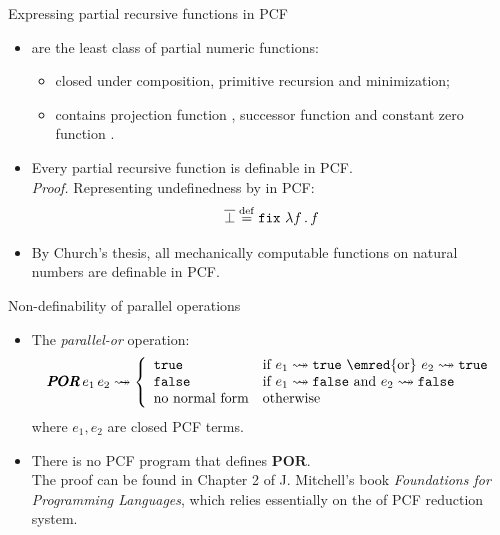 \documentclass[paper=screen,mode=present,style=zysimple]{powerdot}
\begin{document}
\begin{slide}{Expressing partial recursive functions in PCF}
\begin{itemize}
\item {} are the least class of partial numeric functions:
\vspace*{-0.5em}
\begin{itemize}
\item closed under composition, primitive recursion and minimization;
\item contains projection function , successor function 
  and constant zero function .
\end{itemize}
\item Every partial recursive function is definable in PCF. \\[0.3em]
{\em Proof. } Representing undefinedness by  in PCF: 
\[
\overline{\bot} \defeq \cfix \, \lambda f \ldot f
\vspace*{-1.5em}
\]
\item By Church's thesis, all mechanically computable functions on natural numbers are definable in PCF.
\end{itemize}
\end{slide}

\begin{slide}{Non-definability of parallel operations}
\begin{itemize}
\item The {\em parallel-or} operation:
\[
\pmb{POR} \, e_1 \, e_2 \reduceto \left \{
\begin{array}{ll}
\ctrue & \mbox{if $e_1 \reduceto \ctrue$ \emred{or}  $e_2 \reduceto \ctrue$} 
\\
\cfalse & \mbox{if $e_1 \reduceto \cfalse$ and $e_2 \reduceto \cfalse$} 
\\
\mbox{no normal form} & \mbox{otherwise}
\end{array}
\right .
\]
where $e_1, e_2$ are closed PCF terms. 
\item There is no PCF program that defines $\pmb{POR}$.
\\[0.3em]
The proof can be found in Chapter 2 of J. Mitchell's book {\em Foundations for Programming Languages},
which relies essentially on the  of PCF reduction system.
\end{itemize}
\end{slide}
\end{document}
